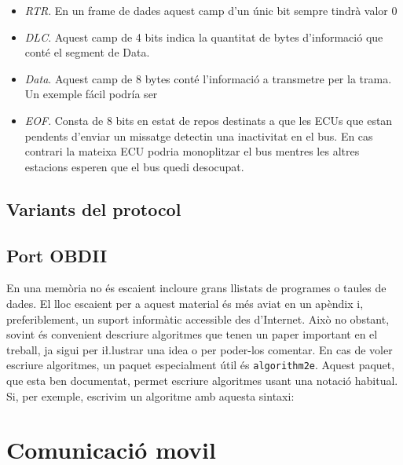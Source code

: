 \documentclass{tfgitic}[2024/07/01]
\begin{document}
\begin{itemize}
  Quan dues ECUs comencen a transmetre alhora, el primer camp que envien és l'ID del missatge. Com que el bit 0 (dominant) 
  té més prioritat que el bit 1 (recessiu), si una ECU amb un ID més gran intenta enviar un 1, però una altra ECU amb un ID 
  més petit envia un 0, la primera detectarà que el bus no coincideix amb el que esperava i es retirarà automàticament. Això 
  permet que la ECU amb l’ID més petit continuï la seva transmissió sense interrupcions, assegurant que el missatge més 
  prioritari arribi sempre primer.
  \item \emph{RTR}. En un frame de dades aquest camp d’un únic bit sempre tindrà valor 0
  \item \emph{DLC}. Aquest camp de 4 bits indica la quantitat de bytes d’informació que conté el segment de Data. 
  \item \emph{Data}. Aquest camp de 8 bytes conté l’informació a transmetre per la trama. Un exemple fácil podría ser  
  \item \emph{EOF}. Consta de 8 bits en estat de repos destinats a que les ECUs que estan pendents d’enviar un missatge 
  detectin una inactivitat en el bus. En cas contrari la mateixa ECU podria monoplitzar el bus mentres les 
  altres estacions esperen que el bus quedi desocupat.
\end{itemize} 

\section{Variants del protocol}

\section{Port OBDII}

En una memòria no és escaient incloure grans llistats de programes o
taules de dades. El lloc escaient per a aquest material és més aviat
en un apèndix i, preferiblement, un suport informàtic accessible des
d'Internet. Això no obstant, sovint és convenient descriure algoritmes
que tenen un paper important en el treball, ja sigui per i\l.lustrar
una idea o per poder-los comentar.  En cas de voler escriure
algoritmes, un paquet especialment útil és \verb!algorithm2e!. Aquest
paquet, que esta ben documentat, permet escriure algoritmes usant una
notació habitual. Si, per exemple, escrivim un algoritme amb aquesta
sintaxi:

\chapter{Comunicació movil}
\end{document}
